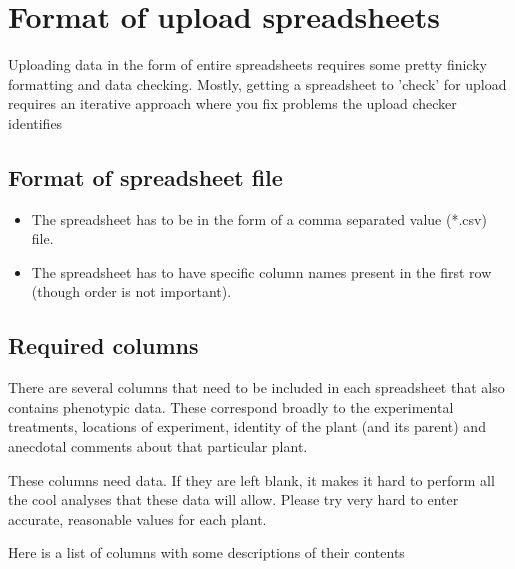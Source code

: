 %







\section*{Format of upload spreadsheets}

Uploading data in the form of entire spreadsheets requires some pretty
finicky formatting and data checking.  Mostly, getting a spreadsheet
to 'check' for upload requires an iterative approach where you fix
problems the upload checker identifies

\subsection*{Format of spreadsheet file}
\begin{itemize}
\item The spreadsheet has to be in the form of a comma separated value
(*.csv) file.  
\item The spreadsheet has to have specific column names present in the first row (though order is not important).
\end{itemize}

\subsection*{Required columns}
There are several columns that need to be included in each spreadsheet
that also contains phenotypic data.  These correspond broadly to the experimental
treatments, locations of experiment, identity of the plant (and its
parent) and anecdotal comments about that particular plant.

These columns need data.  If they are left blank, it makes it hard to
perform all the cool analyses that these data will allow.  Please try
very hard to enter accurate, reasonable values for each plant.

Here is a list of columns with some descriptions of their contents

